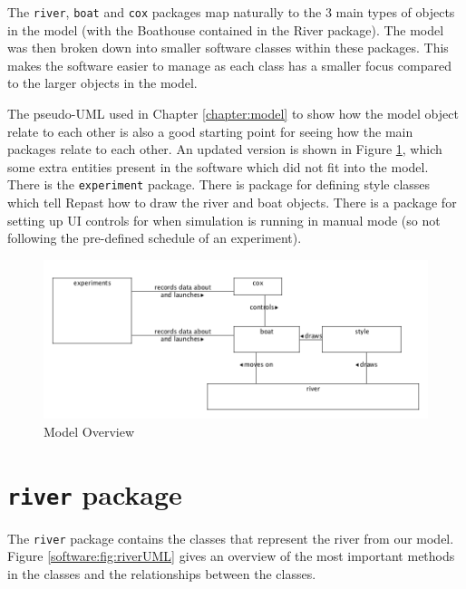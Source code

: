 The \texttt{river}, \texttt{boat} and \texttt{cox} packages map
naturally to the 3 main types of objects in the model (with the
Boathouse contained in the River package). The model was
then broken down into smaller software classes within these packages. This
makes the software easier to manage as each class has a smaller focus
compared to the larger objects in the model.

The pseudo-UML used in Chapter \ref{chapter:model} to show how the model object relate to each other is also a
good starting point for seeing how the main packages relate to each
other. An updated version is shown in Figure \ref{software:fig:modeloverview}, which some extra entities present in the software which did not fit into the model. There
is the \texttt{experiment} package. There is package for defining style
classes which tell Repast how to draw the river and boat
objects. There is a package for setting up UI controls for when
simulation is running in manual mode (so not following the
pre-defined schedule of an experiment).

\begin{figure}
\begin{center}
  \includegraphics[scale=0.3]{images/packages.png}
  \caption{Model Overview}
  \label{software:fig:modeloverview}
\end{center}
\end{figure}



\section{\texttt{river} package}
The \texttt{river} package contains the classes that represent the river from our model. Figure \ref{software:fig:riverUML} gives an overview of the most important methods in the classes and the relationships between the classes.

